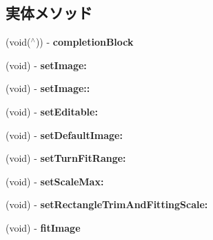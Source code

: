 \subsection*{実体メソッド}
\begin{DoxyCompactItemize}
\item 
\hypertarget{interface_m_edit_image_view_acc11795b6ada0be8782589e8251c9c6e}{}(void($^\wedge$)) -\/ {\bfseries completion\+Block}\label{interface_m_edit_image_view_acc11795b6ada0be8782589e8251c9c6e}

\item 
\hypertarget{interface_m_edit_image_view_aa943067988736abc51d5623c04935b2d}{}(void) -\/ {\bfseries set\+Image\+:}\label{interface_m_edit_image_view_aa943067988736abc51d5623c04935b2d}

\item 
\hypertarget{interface_m_edit_image_view_aa8ab80723a1f4456ba9193b169696cb7}{}(void) -\/ {\bfseries set\+Image\+::}\label{interface_m_edit_image_view_aa8ab80723a1f4456ba9193b169696cb7}

\item 
\hypertarget{interface_m_edit_image_view_a5e66ec54e9de2a964277a71c61912b9d}{}(void) -\/ {\bfseries set\+Editable\+:}\label{interface_m_edit_image_view_a5e66ec54e9de2a964277a71c61912b9d}

\item 
\hypertarget{interface_m_edit_image_view_ad8f8de25b7e94b9db005bcfc1b5cc558}{}(void) -\/ {\bfseries set\+Default\+Image\+:}\label{interface_m_edit_image_view_ad8f8de25b7e94b9db005bcfc1b5cc558}

\item 
\hypertarget{interface_m_edit_image_view_aede83ade9d9a5db6f5fdfbe91e5da984}{}(void) -\/ {\bfseries set\+Turn\+Fit\+Range\+:}\label{interface_m_edit_image_view_aede83ade9d9a5db6f5fdfbe91e5da984}

\item 
\hypertarget{interface_m_edit_image_view_a3e6187c079be74f07aac85b4b3808b09}{}(void) -\/ {\bfseries set\+Scale\+Max\+:}\label{interface_m_edit_image_view_a3e6187c079be74f07aac85b4b3808b09}

\item 
\hypertarget{interface_m_edit_image_view_a5a52d9f695cd8345a6daa55c5fe713a7}{}(void) -\/ {\bfseries set\+Rectangle\+Trim\+And\+Fitting\+Scale\+:}\label{interface_m_edit_image_view_a5a52d9f695cd8345a6daa55c5fe713a7}

\item 
\hypertarget{interface_m_edit_image_view_ae16694f2c8174a5c063b7a5a268a2b8e}{}(void) -\/ {\bfseries fit\+Image}\label{interface_m_edit_image_view_ae16694f2c8174a5c063b7a5a268a2b8e}


\end{DoxyCompactItemize}
